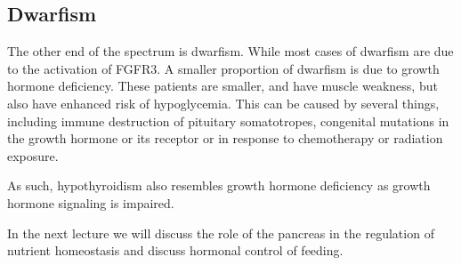 \documentclass{tufte-handout}
\begin{document}
\subsection{Dwarfism}

The other end of the spectrum is dwarfism.  While most cases of dwarfism are due to the activation of FGFR3\cite{Shiang1994}.  A smaller proportion of dwarfism is due to growth hormone deficiency.  These patients are smaller, and have muscle weakness, but also have enhanced risk of hypoglycemia.  This can be caused by several things, including immune destruction of pituitary somatotropes, congenital mutations in the growth hormone or its receptor or in response to chemotherapy or radiation exposure. 

  As such, hypothyroidism also resembles growth hormone deficiency as growth hormone signaling is impaired.

In the next lecture we will discuss the role of the pancreas in the regulation of nutrient homeostasis and discuss hormonal control of feeding.
\listoffigures
\listoftables



\end{document}
